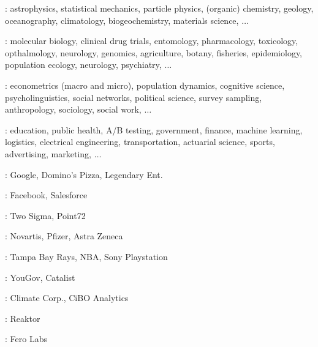 \documentclass[9pt]{report}
\begin{document}
% 
\begin{subitemize}
\item {}: {\footnotesize
    astrophysics, statistical mechanics, particle physics, (organic) chemistry, geology, oceanography, climatology, biogeochemistry, materials science, $\ldots$
  }
  \vspace*{-3pt}
\item {}: {\footnotesize
    molecular biology, clinical drug trials, entomology, pharmacology,
    toxicology, opthalmology, neurology, genomics, agriculture, botany, fisheries,
    epidemiology, population ecology, neurology, psychiatry, $\ldots$
  }
  \vspace*{-3pt}
\item {}: {\footnotesize
    econometrics (macro and micro), population dynamics, cognitive
    science, psycholinguistics, social networks, political science,
    survey sampling, anthropology, sociology, social work, $\ldots$
  }
  \vspace*{-3pt}
\item {}: {\footnotesize education, public health, A/B testing,
    government, finance, machine learning, logistics, electrical engineering,  transportation, actuarial science, sports, advertising, marketing, $\ldots$}
\end{subitemize}

\vspace*{3pt}
\begin{subitemize}
\item {}: Google, Domino's Pizza, Legendary Ent.
\item {}: Facebook, Salesforce
\item {}: Two Sigma, Point72
\item {}: Novartis, Pfizer, Astra Zeneca
\item {}: Tampa Bay Rays, NBA, Sony Playstation
\item {}: YouGov, Catalist
\item {}: Climate Corp., CiBO Analytics
\item {}: Reaktor
\item {}: Fero Labs
\end{subitemize}
\end{document}
